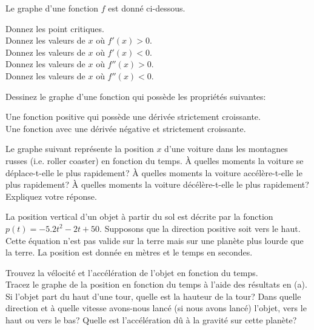 \begin{question}
Le graphe d'une fonction $f$ est donné ci-dessous.

 Donnez les point critiques.\\
 Donnez les valeurs de $x$ où $f'(x)>0$.\\
 Donnez les valeurs de $x$ où $f'(x)<0$.\\
 Donnez les valeurs de $x$ où $f''(x)>0$.\\
 Donnez les valeurs de $x$ où $f''(x)<0$.
\label{6Q5}
\end{question}

\begin{question}
Dessinez le graphe d'une fonction qui possède les propriétés suivantes:

 Une fonction positive qui possède une dérivée strictement
croissante.\\
 Une fonction avec une dérivée négative et strictement croissante.
\label{6Q6}
\end{question}

\begin{question}
Le graphe suivant représente la position $x$ d'une voiture dans les montagnes
russes (i.e. \lgm roller coaster\rgm) en fonction du temps.  À quelles
moments la voiture se déplace-t-elle le plus rapidement?  À quelles moments
la voiture accélère-t-elle le plus rapidement?  À quelles moments la voiture
décélère-t-elle le plus rapidement?  Expliquez votre réponse.
\label{6Q7}
\end{question}

\begin{question}
La position vertical d'un objet à partir du sol est décrite par la
fonction $p(t) = -5.2 t^2 - 2 t + 50$.  Supposons que la direction
positive soit vers le haut.  Cette équation n'est pas valide sur la
terre mais sur une planète plus lourde que la terre.  La position est
donnée en mètres et le temps en secondes.

 Trouvez la vélocité et l'accélération de l'objet en fonction
du temps.\\
 Tracez le graphe de la position en fonction du temps à l'aide
des résultats en (a).\\
 Si l'objet part du haut d'une tour, quelle est la hauteur de
la tour?  Dans quelle direction et à quelle vitesse avons-nous lancé (si
nous avons lancé) l'objet, vers le haut ou vers le bas?  Quelle est
l'accélération dû à la gravité sur cette planète?
\label{6Q8}
\end{question}

